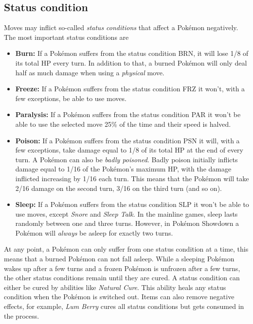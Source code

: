 \subsection{Status condition}
\label{sec:status-condition}
Moves may inflict so-called \textit{status conditions} that affect a Pokémon negatively.
The most important status conditions are
\begin{itemize}
	\item \textbf{Burn:} If a Pokémon suffers from the status condition \ac{BRN}, it will lose 1/8 of its
		total \ac{HP} every turn. In addition to that, a burned Pokémon will only deal half as much damage
		when using a \textit{physical} move.
	\item \textbf{Freeze:} If a Pokémon suffers from the status condition \ac{FRZ} it won't, with a few exceptions,
		be able to use moves. 
	\item \textbf{Paralysis:} If a Pokémon suffers from the status condition \ac{PAR} it won't be able to use 
		the selected move 25\% of the time and their speed is halved.
	\item \textbf{Poison:} If a Pokémon suffers from the status condition \ac{PSN} it will, with a few exceptions,
		take damage equal to 1/8 of its total \ac{HP} at the end of every turn. A Pokémon can also be 
		\textit{badly poisoned}. Badly poison initially inflicts damage equal to 1/16 of the Pokémon's maximum
		\ac{HP}, with the damage inflicted increasing by 1/16 each turn. This means that the Pokémon will
		take 2/16 damage on the second turn, 3/16 on the third turn (and so on).
	\item \textbf{Sleep:} If a Pokémon suffers from the status condition \ac{SLP} it won't be able to use moves,
		except \textit{Snore} and \textit{Sleep Talk}. In the mainline games, sleep lasts randomly between
		one and three turns. However, in Pokémon Showdown a Pokémon will \textit{always} be asleep for exactly
		two turns.
\end{itemize}

At any point, a Pokémon can only suffer from one status condition at a time, this means that a 
burned Pokémon can not fall asleep. While a sleeping Pokémon wakes up after a few turns and a 
frozen Pokémon is unfrozen after a few turns, the other status conditions remain until they are 
cured. A status condition can either be cured by abilities like \textit{Natural Cure}. This ability
heals any status condition when the Pokémon is switched out. Items can also remove negative effects,
for example, \textit{Lum Berry} cures all status conditions but gets consumed in the process.

